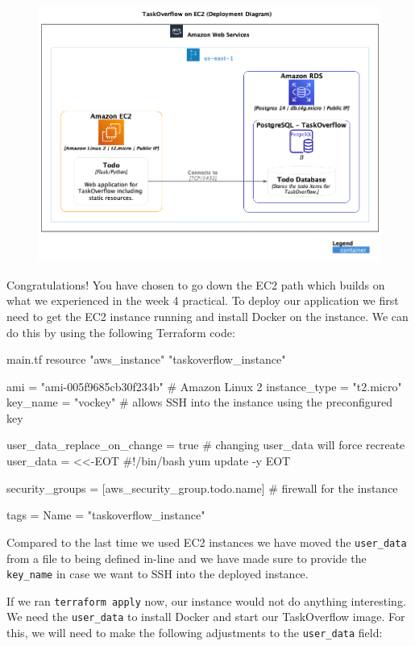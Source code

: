 \documentclass{csse4400}
\begin{document}
\begin{figure}[H]
  \includegraphics[width=\textwidth]{diagrams/ec2deployment}
\end{figure}

Congratulations! You have chosen to go down the EC2 path which builds on what we experienced in the week 4 practical.
To deploy our application we first need to get the EC2 instance running and install Docker on the instance.
We can do this by using the following Terraform code:

\begin{code}[language=terraform,numbers=none]{main.tf}
resource "aws_instance" "taskoverflow_instance" {
    ami           = "ami-005f9685cb30f234b" # Amazon Linux 2
    instance_type = "t2.micro"
    key_name      = "vockey" # allows SSH into the instance using the preconfigured key
    
    user_data_replace_on_change = true # changing user_data will force recreate
    user_data                   = <<-EOT
#!/bin/bash
yum update -y
    EOT
  
    security_groups = [aws_security_group.todo.name] # firewall for the instance

    tags = {
        Name = "taskoverflow_instance"
    }
}
\end{code}

Compared to the last time we used EC2 instances we have moved the \texttt{user\_data} from a file to being defined in-line and we have made sure to provide the \texttt{key\_name} in case we want to SSH into the deployed instance.

If we ran \texttt{terraform apply} now, our instance would not do anything interesting.
We need the \texttt{user\_data} to install Docker and start our TaskOverflow image.
For this, we will need to make the following adjustments to the \texttt{user\_data} field:
\end{document}
